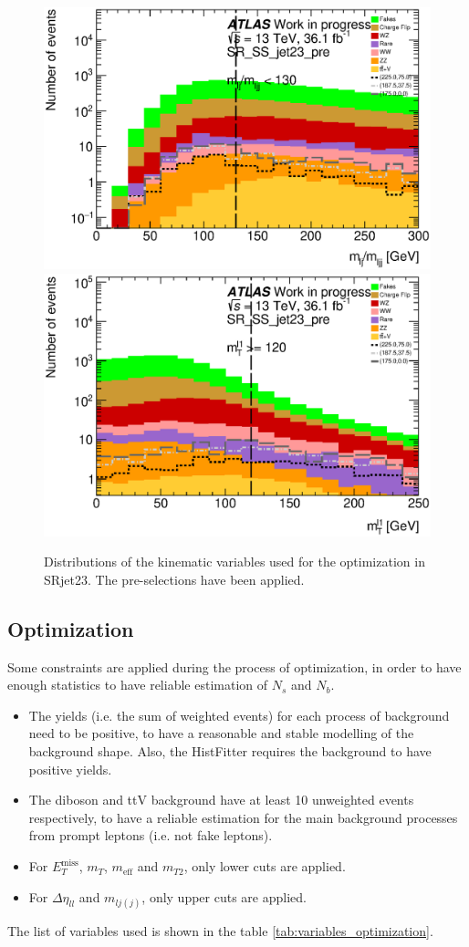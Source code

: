 \begin{figure}[htpb]
\includegraphics[width=0.45\linewidth]{data/plot/plot_SR/mlj_SR_SS_jet23_pre}
\includegraphics[width=0.45\linewidth]{data/plot/plot_SR/mt1_SR_SS_jet23_pre}\\
\caption{Distributions of the kinematic variables used for the optimization in SRjet23. The pre-selections have been applied.}
\label{fig:SRjet23_pre-selection}
\end{figure}

\subsection{Optimization}
Some constraints are applied during the process of optimization, in order to have enough statistics to have reliable estimation of $N_s$ and $N_b$.
\begin{itemize}
\item The yields (i.e. the sum of weighted events) for each process of background need to be positive, to have a reasonable and stable modelling of the background shape.
Also, the HistFitter requires the background to have positive yields.
\item The diboson and ttV background have at least 10 unweighted events respectively, to have a reliable estimation for the main background processes from prompt leptons (i.e. not fake leptons).
\item For $E_T^{\text{miss}}$, $m_T$, $m_{\text{eff}}$ and $m_{T2}$, only lower cuts are applied.
\item For $\Delta \eta_{ll}$ and $m_{lj(j)}$, only upper cuts are applied.
\end{itemize}

The list of variables used is shown in the table \ref{tab:variables_optimization}.

